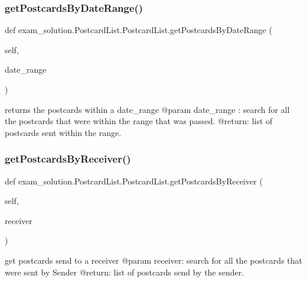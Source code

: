 \subsubsection{\texorpdfstring{getPostcardsByDateRange()}{getPostcardsByDateRange()}}
{\footnotesize\ttfamily def exam\+\_\+solution.\+Postcard\+List.\+Postcard\+List.\+get\+Postcards\+By\+Date\+Range (\begin{DoxyParamCaption}\item[{}]{self,  }\item[{}]{date\+\_\+range }\end{DoxyParamCaption})}

\begin{DoxyVerb}returns the postcards within a date_range
@param date_range : search for all the postcards
that were  within the range that was passed.
@return: list of postcards sent within the range.
\end{DoxyVerb}
 \mbox{\label{classexam__solution_1_1PostcardList_1_1PostcardList_a06dfdb659c6ca3927398930b11fd3da1}} 
\subsubsection{\texorpdfstring{getPostcardsByReceiver()}{getPostcardsByReceiver()}}
{\footnotesize\ttfamily def exam\+\_\+solution.\+Postcard\+List.\+Postcard\+List.\+get\+Postcards\+By\+Receiver (\begin{DoxyParamCaption}\item[{}]{self,  }\item[{}]{receiver }\end{DoxyParamCaption})}

\begin{DoxyVerb}get postcards send to a receiver
@param receiver: search for all the postcards
that were sent by Sender
@return: list of postcards send by the sender.
\end{DoxyVerb}
 \mbox{\label{classexam__solution_1_1PostcardList_1_1PostcardList_aea2d6822e4b9dd4182502f44e1a25e2d}} 
